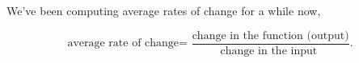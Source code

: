 \documentclass{ximera}
\begin{document}
We've been computing average rates of change for a while now, 

\[
{\text{average rate of change=
    }}
\frac{\text{change in the function (output)}}{\text{change in the input 
   }}.
\]
\begin{comment}
 how exactly does one find the function that will give the
instantaneous rate of change? Recall that the instantaneous rate of change
of a line is the slope of the line.  Hence the instantaneous rate of
change of a function is the slope of the tangent line. For now,
consider the following informal definition of a \textit{tangent line}:
\begin{quote}\index{tangent line}
Given a function $f$ and a number $a$ in the domain of $f$, if one can ``zoom in''
on the graph at $(a, f(a))$ sufficiently so that it appears to be a straight line,
then that line is the \textbf{tangent line} to $f(x)$ at the point $(a,f(a))$.
\end{quote}
We illustrate this informal definition with the following diagram:
\begin{image}
\begin{tikzpicture}
  \begin{axis}[
            domain=0:6, range=0:7,
            ymin=-.2,ymax=7,
            width=6in,
            height=2.5in, %
            axis lines=none,
          ]   
          \addplot [draw=none, fill=textColor!10!background] plot coordinates {(.8,1.6) (2.834,5)} \closedcycle; %
          \addplot [draw=none, fill=textColor!10!background] plot coordinates {(2.834,5) (4.166,5)} \closedcycle; %
          \addplot [draw=none, fill=background] plot coordinates {(1.2,1.6) (4.166,5)} \closedcycle; %
          \addplot [draw=none, fill=background] plot coordinates {(.8,1.6) (1.2,1.6)} \closedcycle; %

          \addplot [draw=none, fill=textColor!10!background] plot coordinates {(3.3,3.6) (5.334,5)} \closedcycle; %
          \addplot [draw=none, fill=textColor!10!background] plot coordinates {(5.334,5) (6.666,5)} \closedcycle; %
          \addplot [draw=none, fill=background] plot coordinates {(3.7,3.6) (6.666,5)} \closedcycle; %
          \addplot [draw=none, fill=background] plot coordinates {(3.3,3.6) (3.7,3.6)} \closedcycle; %
          
          \addplot [draw=none, fill=textColor!10!background] plot coordinates {(3.7,2.4) (6.666,1)} \closedcycle; %
          \addplot [draw=none, fill=textColor!10!background] plot coordinates {(3.3,2.4) (3.7,2.4)} \closedcycle; %
          \addplot [draw=none, fill=background] plot coordinates {(3.3,2.4) (5.334,1)} \closedcycle; %
          \addplot [draw=none, fill=background] plot coordinates {(5.334,1) (6.666,1)} \closedcycle; %
          


\end{comment}
\end{document}
